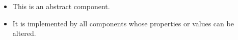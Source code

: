 \begin{itemize}
\item This is an abstract component.
\item It is implemented by all components whose properties or values can be altered.
\end{itemize}

